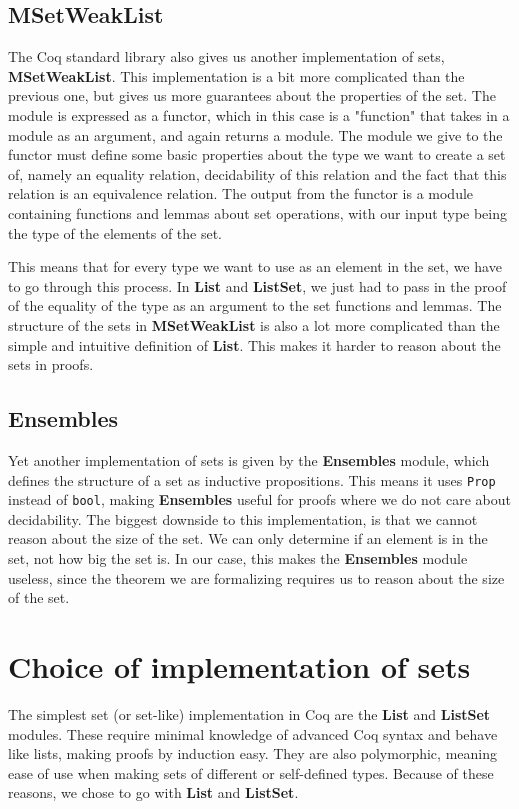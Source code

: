\subsection{MSetWeakList}

The Coq standard library also gives us another implementation of sets, \textbf{MSetWeakList}.
This implementation is a bit more complicated than the previous one,
but gives us more guarantees about the properties of the set.
The module is expressed as a functor, which in this case is a "function" that takes in a module as an argument, and again returns a module.
The module we give to the functor must define some basic properties about the type we want to create a set of,
namely an equality relation, decidability of this relation and the fact that this relation is an equivalence relation.
The output from the functor is a module containing functions and lemmas about set operations,
with our input type being the type of the elements of the set.

This means that for every type we want to use as an element in the set, we have to go through this process.
In \textbf{List} and \textbf{ListSet}, we just had to pass in the proof of the equality of the type as an argument to the set functions and lemmas.
The structure of the sets in \textbf{MSetWeakList} is also a lot more complicated than the simple and intuitive definition of \textbf{List}.
This makes it harder to reason about the sets in proofs.

\subsection{Ensembles}

Yet another implementation of sets is given by the \textbf{Ensembles} module, which defines the structure of a set as inductive propositions.
This means it uses \lstinline{Prop} instead of \lstinline{bool},
making \textbf{Ensembles} useful for proofs where we do not care about decidability.
The biggest downside to this implementation, is that we cannot reason about the size of the set.
We can only determine if an element is in the set, not how big the set is.
In our case, this makes the \textbf{Ensembles} module useless, since the theorem we are formalizing requires us to reason about the
size of the set.

\section{Choice of implementation of sets}

The simplest set (or set-like) implementation in Coq are the \textbf{List} and \textbf{ListSet} modules.
These require minimal knowledge of advanced Coq syntax and behave like lists, making proofs by induction easy.
They are also polymorphic, meaning ease of use when making sets of different or self-defined types.
Because of these reasons, we chose to go with \textbf{List} and \textbf{ListSet}.
